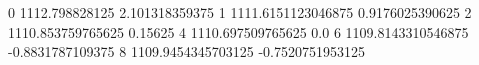 0 1112.798828125 2.101318359375
1 1111.6151123046875 0.9176025390625
2 1110.853759765625 0.15625
4 1110.697509765625 0.0
6 1109.8143310546875 -0.8831787109375
8 1109.9454345703125 -0.7520751953125
